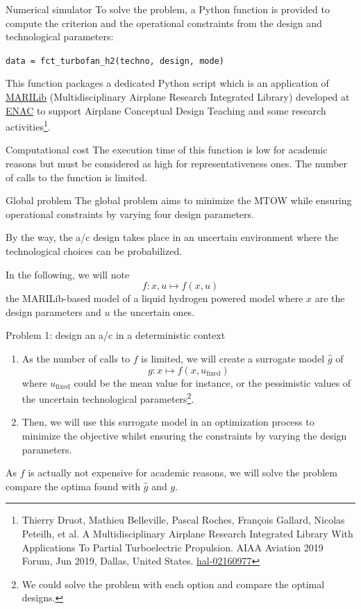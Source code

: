 \documentclass[aspectratio=169]{beamer}
\begin{document}
\begin{frame}[fragile]{Numerical simulator}
    To solve the problem,
    a Python function is provided to compute the criterion and the operational constraints
    from the design and technological parameters:

    \texttt{data = fct\_turbofan\_h2(techno, design, mode)}

    This function packages a dedicated Python script which is an application of \href{https://github.com/marilib/MARILib_obj}{MARILib} (Multidisciplinary Airplane Research Integrated Library) developed at \href{https://www.enac.fr/en}{ENAC} to support Airplane Conceptual Design Teaching and some research activities\footnote{
    Thierry Druot, Mathieu Belleville, Pascal Roches, Fran\c{c}ois Gallard, Nicolas Peteilh, et al. A Multidisciplinary Airplane Research Integrated Library With Applications To Partial Turboelectric Propulsion. AIAA Aviation 2019 Forum, Jun 2019, Dallas, United States. \href{https://hal-enac.archives-ouvertes.fr/hal-02160977}{hal-02160977}
    }.

    \begin{alertblock}{Computational cost}
        The execution time of this function is low for academic reasons
        but must be considered as high for representativeness ones.
        The number of calls to the function is limited.
    \end{alertblock}
\end{frame}
\begin{frame}{Global problem}
    The global problem aims to
    minimize the MTOW
    while ensuring operational constraints
    by varying four design parameters.

    By the way, the a/c design takes place in an uncertain environment where the technological choices can be probabilized.

    In the following, we will note $$f:x,u\mapsto f(x,u)$$ the MARILib-based model of a liquid hydrogen powered model where $x$ are the design parameters and $u$ the uncertain ones.
\end{frame}
\begin{frame}{Problem 1: design an a/c in a deterministic context}
    \begin{enumerate}
        \item As the number of calls to $f$ is limited,
              we will create a surrogate model $\hat{g}$ of $$g:x\mapsto f(x,u_{\textrm{fixed}})$$
              where $u_{\textrm{fixed}}$ could be the mean value for instance,
              or the pessimistic values of the uncertain technological parameters\footnote{We could solve the problem with each option and compare the optimal designs.}.
        \item Then,
              we will use this surrogate model in an optimization process to minimize the objective whilst ensuring the constraints by varying the design parameters.
    \end{enumerate}
As $f$ is actually not expensive for academic reasons,
we will solve the problem  compare the optima found with $\hat{g}$ and $g$.
\end{frame}
\end{document}
